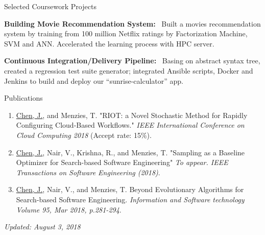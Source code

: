 \documentclass{resume} %
\begin{document}
\begin{rSection}{Selected Coursework Projects}



\textbf{Building Movie Recommendation System:}~
Built a movies recommendation system by training from 100 million
Netflix ratings
by Factorization Machine, SVM and ANN. Accelerated the learning process with HPC server.


\textbf{Continuous Integration/Delivery Pipeline:}~
Basing on abstract syntax tree, created a regression test suite generator;
integrated Ansible scripts, Docker and Jenkins to build and deploy our ``sunrise-calculator'' app.

\end{rSection} 

\begin{rSection}{ Publications} 
\begin{enumerate}[wide, labelwidth=!, labelindent=0pt]
\item \underline{Chen, J.}, and Menzies, T. "RIOT: a Novel Stochastic Method for Rapidly Configuring Cloud-Based Workflows." \textit{IEEE International Conference on Cloud Computing 2018} (Accept rate: 15\%).
\item \underline{Chen, J.}, Nair, V., Krishna, R., and Menzies, T. "Sampling as a Baseline Optimizer for Search-based Software Engineering" \textit{To appear. IEEE Transactions on Software Engineering (2018)}.
\item \underline{Chen, J.}, Nair, V., and  Menzies, T. Beyond Evolutionary Algorithms for Search-based Software Engineering. \textit{Information and Software technology Volume 95, Mar 2018, p.281-294}.
\end{enumerate}

\end{rSection}

\begin{flushright}
{\scriptsize \textit{Updated: August 3, 2018}}
\end{flushright}
\end{document}
